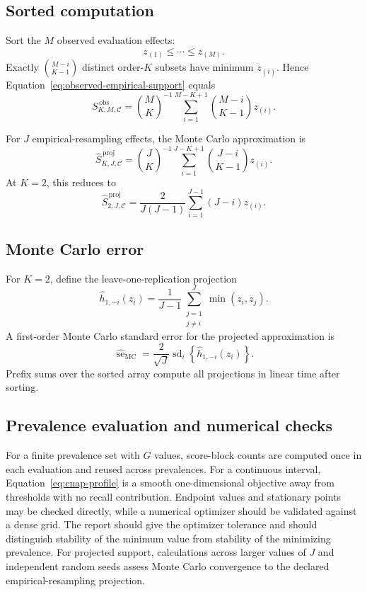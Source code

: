 \documentclass[11pt]{article}
\newcommand{\CSet}{\mathcal{C}}
\theoremstyle{remark}
\begin{document}
\subsection{Sorted computation}

Sort the $M$ observed evaluation effects:
\[
z_{(1)}\leq\cdots\leq z_{(M)}.
\]
Exactly $\binom{M-i}{K-1}$ distinct order-$K$ subsets have minimum
$z_{(i)}$. Hence Equation~\eqref{eq:observed-empirical-support} equals
\begin{equation}
S_{K,M,\CSet}^{\,\mathrm{obs}}
=
\binom{M}{K}^{-1}
\sum_{i=1}^{M-K+1}
\binom{M-i}{K-1}z_{(i)}.
\label{eq:sorted-observed}
\end{equation}

For $J$ empirical-resampling effects, the Monte Carlo approximation is
\begin{equation}
\widehat S_{K,J,\CSet}^{\,\mathrm{proj}}
=
\binom{J}{K}^{-1}
\sum_{i=1}^{J-K+1}
\binom{J-i}{K-1}z_{(i)}.
\label{eq:sorted-bootstrap}
\end{equation}
At $K=2$, this reduces to
\[
\widehat S_{2,J,\CSet}^{\,\mathrm{proj}}
=
\frac{2}{J(J-1)}
\sum_{i=1}^{J-1}(J-i)z_{(i)}.
\]

\subsection{Monte Carlo error}

For $K=2$, define the leave-one-replication projection
\[
\widehat h_{1,-i}(z_i)
=
\frac1{J-1}\sum_{\substack{j=1\\j\ne i}}^{J}\min(z_i,z_j).
\]
A first-order Monte Carlo standard error for the projected approximation is
\begin{equation}
\widehat{\operatorname{se}}_{\mathrm{MC}}
=
\frac2{\sqrt J}
\operatorname{sd}_{i}
\left\{
\widehat h_{1,-i}(z_i)
\right\}.
\label{eq:mcse}
\end{equation}
Prefix sums over the sorted array compute all projections in linear time after
sorting.

\subsection{Prevalence evaluation and numerical checks}

For a finite prevalence set with $G$ values, score-block counts are computed once in each evaluation and reused across prevalences. For a continuous interval, Equation~\eqref{eq:cnap-profile} is a smooth one-dimensional objective away from thresholds with no recall contribution. Endpoint values and stationary points may be checked directly, while a numerical optimizer should be validated against a dense grid. The report should give the optimizer tolerance and should distinguish stability of the minimum value from stability of the minimizing prevalence. For projected support, calculations across larger values of $J$ and independent random seeds assess Monte Carlo convergence to the declared empirical-resampling projection.
\end{document}
